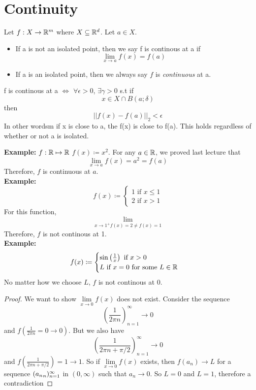 \documentclass[openany]{report}
\begin{document}
\section{Continuity}
\begin{definition}
    Let $f: X\rightarrow \mathbb{R}^m$ where $X \subseteq \mathbb{R}^d$. Let $a \in X$.
    \begin{itemize}
        \item If a is not an isolated point, then we say f is continous at a if 
        \[\lim_{x\rightarrow a}f(x) = f(a)\]
        \item If a is an isolated point, then we always say $f$ is \emph{continuous} at a.
    \end{itemize}
\end{definition}
\begin{definition}
    f is continous at a $\iff$ $\forall \epsilon > 0$, $\exists \gamma > 0$ s.t if
    \[x \in X \cap B(a; \delta)\]
    then 
    \[||f(x) - f(a)||_2 < \epsilon\]
    In other wordsm if x is close to a, the f(x) is close to f(a). This holds regardless of whether or not a is isolated.
\end{definition}
\noindent
\textbf{Example:} $f: \mathbb{R} \mapsto \mathbb{R}$ $f(x) \coloneqq x^2$. For any $a \in \mathbb{R}$, we proved last lecture that 
\[\lim_{x\rightarrow a}f(x) = a^2 = f(a)\]
Therefore, $f$ is continuous at $a$.\\[2ex]
\textbf{Example:} 
\[f(x) \coloneqq \begin{cases}
    1 \text{  if } x \leq 1\\
    2 \text{  if } x > 1
\end{cases}\]
For this function, 
\[\lim_{x \rightarrow 1^+ f(x) = 2 \neq f(x) = 1}\]
Therefore, $f$ is not continous at 1.\\[2ex]
\textbf{Example:} 
\[f(x) \coloneqq \begin{cases}
    \sin\left(\frac{1}{x}\right) \text{  if } x > 0\\
    L \text{  if } x = 0 \text{ for some $L \in \mathbb{R}$}\\
\end{cases}\]
No matter how we choose $L$, $f$ is not continous at 0. 
\begin{proof}
    We want to show $\lim\limits_{x \rightarrow 0}f(x)$ does not exist. Consider the sequence 
    \[\left(\frac{1}{2\pi n}\right)^\infty_{n=1} \rightarrow 0\]
    and $f\left(\frac{1}{2\pi n} = 0 \rightarrow 0\right)$. But we also have 
    \[\left(\frac{1}{2\pi n + \pi/2}\right)_{n=1}^\infty \rightarrow 0\]
    and $f\left(\frac{1}{2\pi n + \pi/2}\right) = 1 \rightarrow 1$. So if $\lim\limits_{x \rightarrow 0}f(x)$ exists, then $f(a_n) \rightarrow L$ for a sequence $({a_n}_n)_{n=1}^\infty$ in $(0, \infty)$ such that $a_n \rightarrow 0$. So $L = 0$ and $L = 1$, therefore a contradiction
\end{proof}
\end{document}
